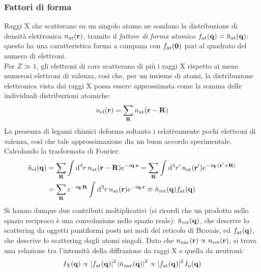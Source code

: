 \subsubsection{Fattori di forma}

Raggi X che scatterano su un singolo atomo ne sondano la distribuzione di densità elettronica $ n_\text{at}(\mathbf{r}) $, tramite il \textit{fattore di forma atomico} $ f_\text{at}(\mathbf{q}) = \tilde{n}_\text{at}(\mathbf{q}) $: questo ha una caratteristica forma a campana con $ f_\text{at}(\mathbf{0}) $ pari al quadrato del numero di elettroni. \\
Per $ Z \gg 1 $, gli elettroni di core scatterano di più i raggi X rispetto ai meno numerosi elettroni di valenza, così che, per un insieme di atomi, la distribuzione elettronica vista dai raggi X possa essere approssimata come la somma delle individuali distribuzioni atomiche:
\begin{equation}
	n_\text{el}(\mathbf{r}) = \sum_{\mathbf{R}} n_\text{at}(\mathbf{r} - \mathbf{R})
\end{equation}
La presenza di legami chimici deforma soltanto i relativamente pochi elettroni di valenza, così che tale approssimazione dia un buon accordo sperimentale. Calcolando la trasformata di Fourier:
\begin{equation*}
	\begin{split}
		\tilde{n}_\text{el}(\mathbf{q})
		& = \sum_{\mathbf{R}} \int \mathrm{d}^3r\, n_\text{at}(\mathbf{r} - \mathbf{R}) e^{-i \mathbf{q} \cdot \mathbf{r}} = \sum_{\mathbf{R}} \int \mathrm{d}^3r'\, n_\text{at}(\mathbf{r}') e^{-i \mathbf{q} \cdot (\mathbf{r}' + \mathbf{R})} \\
		& = \sum_{\mathbf{R}} e^{-i \mathbf{q} \cdot \mathbf{R}} \int \mathrm{d}^3r\, n_\text{at}(\mathbf{r}) e^{-i \mathbf{q} \cdot \mathbf{r}} \equiv \tilde{n}_\text{ret}(\mathbf{q}) f_\text{at}(\mathbf{q})
	\end{split}
\end{equation*}
Si hanno dunque due contributi moltiplicativi (si ricordi che un prodotto nello spazio reciproco è una convoluzione nello spazio reale): $ \tilde{n}_\text{ret}(\mathbf{q}) $, che descrive lo scattering da oggetti puntiformi posti nei nodi del reticolo di Bravais, ed $ f_\text{at}(\mathbf{q}) $, che descrive lo scattering dagli atomi singoli. Dato che $ n_\text{nuc}(\mathbf{r}) \propto n_\text{ret}(\mathbf{r}) $, si trova una relazione tra l'intensità della diffrazione da raggi X e quella da neutroni:
\begin{equation}
	I_\text{X}(\mathbf{q}) \propto \left\lvert f_\text{at}(\mathbf{q})\right\rvert^2 \left\lvert\tilde{n}_\text{nuc}(\mathbf{q})\right\rvert^2 \propto \left\lvert f_\text{at}(\mathbf{q})\right\rvert^2 I_\text{n}(\mathbf{q})
\end{equation}
